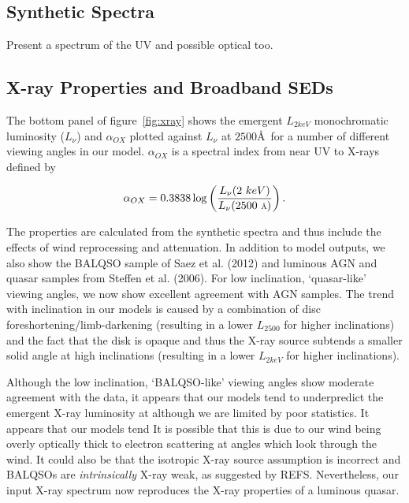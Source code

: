 \documentclass[useAMS,usenatbib]{mn2e_x}
\begin{document}
\subsection{Synthetic Spectra}

Present a spectrum of the UV and possible optical too. 



\subsection{X-ray Properties and Broadband SEDs}

The bottom panel of figure~\ref{fig:xray} shows the emergent $L_{2keV}$ 
monochromatic luminosity ($L_\nu$) and $\alpha_{OX}$ plotted against 
$L_\nu$ at $2500$\AA\ for a number of different viewing angles in our model.
$\alpha_{OX}$ is a spectral index from near UV to X-rays defined by

\begin{equation}
\alpha_{OX}=0.3838\log\left(\frac{L_{\nu}(2~keV)}{L_{\nu}(2500~\mbox{\scriptsize{\AA}})}\right).
\end{equation}

The properties are calculated from the synthetic spectra and thus include
the effects of wind reprocessing and attenuation. In addition to model outputs,
we also show the BALQSO sample of Saez et al. (2012) and luminous AGN and quasar
samples from Steffen et al. (2006). For low inclination, `quasar-like' viewing angles,
we now show excellent agreement with AGN samples. The trend with inclination
in our models is caused by a combination of disc foreshortening/limb-darkening 
(resulting in a lower $L_{2500}$ for higher inclinations) and the fact that the disk 
is opaque and thus the X-ray source subtends a smaller solid angle at high inclinations
(resulting in a lower $L_{2keV}$ for higher inclinations). 

Although the low inclination, `BALQSO-like' viewing angles show moderate agreement with the data,
it appears that our models tend to underpredict the emergent X-ray luminosity at 
although we are limited by poor statistics. It appears that our models tend
It is possible that this is due to our wind being overly optically thick to 
electron scattering at angles which look through the wind. It could also be that the
isotropic X-ray source assumption is incorrect and BALQSOs are {\em intrinsically} 
X-ray weak, as suggested by REFS. Nevertheless, our input X-ray spectrum
now reproduces the X-ray properties of a luminous quasar.
\end{document}
